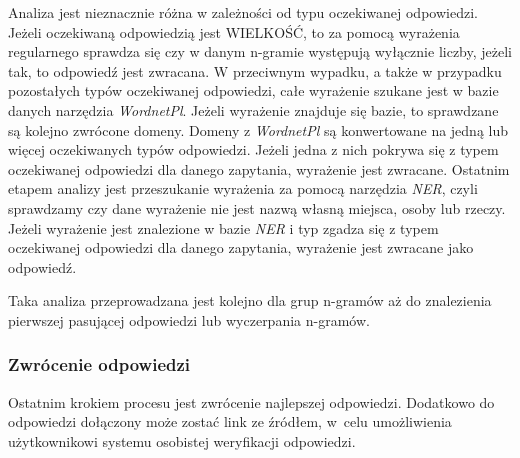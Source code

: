 Analiza jest nieznacznie różna w zależności od typu oczekiwanej odpowiedzi. Jeżeli oczekiwaną odpowiedzią jest WIELKOŚĆ, to za pomocą wyrażenia regularnego sprawdza się czy w danym n-gramie występują wyłącznie liczby, jeżeli tak, to odpowiedź jest zwracana. W przeciwnym wypadku, a także w przypadku pozostałych typów oczekiwanej odpowiedzi, całe wyrażenie szukane jest w bazie danych narzędzia \emph{WordnetPl}. Jeżeli wyrażenie znajduje się bazie, to sprawdzane są kolejno zwrócone domeny. Domeny z \emph{WordnetPl} są konwertowane na jedną lub więcej oczekiwanych typów odpowiedzi. Jeżeli jedna z nich pokrywa się z typem oczekiwanej odpowiedzi dla danego zapytania, wyrażenie jest zwracane. Ostatnim etapem analizy jest przeszukanie wyrażenia za pomocą narzędzia \emph{NER}, czyli sprawdzamy czy dane wyrażenie nie jest nazwą własną miejsca, osoby lub rzeczy. Jeżeli wyrażenie jest znalezione w bazie \emph{NER} i typ zgadza się z typem oczekiwanej odpowiedzi dla danego zapytania, wyrażenie jest zwracane jako odpowiedź. 

Taka analiza przeprowadzana jest kolejno dla grup n-gramów aż do znalezienia pierwszej pasującej odpowiedzi lub wyczerpania n-gramów. 

\subsubsection{Zwrócenie odpowiedzi}
Ostatnim krokiem procesu jest zwrócenie najlepszej odpowiedzi. Dodatkowo do odpowiedzi dołączony może zostać link ze źródłem, w~celu umożliwienia użytkownikowi systemu osobistej weryfikacji odpowiedzi.


